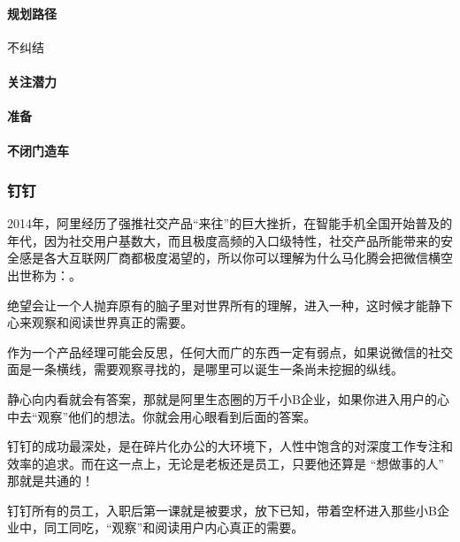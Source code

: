 \documentclass[letterpaper,11pt,english]{sphinxmanual}
\begin{document}
\paragraph{规划路径}
\label{\detokenize{chapter_experience/diudiu:id5}}
不纠结



\paragraph{关注潜力}
\label{\detokenize{chapter_experience/diudiu:id6}}

\paragraph{准备}
\label{\detokenize{chapter_experience/diudiu:id7}}

\paragraph{不闭门造车}
\label{\detokenize{chapter_experience/diudiu:id8}}

\subsubsection{钉钉}
\label{\detokenize{chapter_experience/dingding:id1}}\label{\detokenize{chapter_experience/dingding::doc}}
2014年，阿里经历了强推社交产品“来往”的巨大挫折，在智能手机全国开始普及的年代，因为社交用户基数大，而且极度高频的入口级特性，社交产品所能带来的安全感是各大互联网厂商都极度渴望的，所以你可以理解为什么马化腾会把微信横空出世称为：。

绝望会让一个人抛弃原有的脑子里对世界所有的理解，进入一种，这时候才能静下心来观察和阅读世界真正的需要。

作为一个产品经理可能会反思，任何大而广的东西一定有弱点，如果说微信的社交面是一条横线，需要观察寻找的，是哪里可以诞生一条尚未挖掘的纵线。

静心向内看就会有答案，那就是阿里生态圈的万千小B企业，如果你进入用户的心中去“观察”他们的想法。你就会用心眼看到后面的答案。

钉钉的成功最深处，是在碎片化办公的大环境下，人性中饱含的对深度工作专注和效率的追求。而在这一点上，无论是老板还是员工，只要他还算是
“想做事的人” 那就是共通的！

钉钉所有的员工，入职后第一课就是被要求，放下已知，带着空杯进入那些小B企业中，同工同吃，“观察”和阅读用户内心真正的需要。
\end{document}
